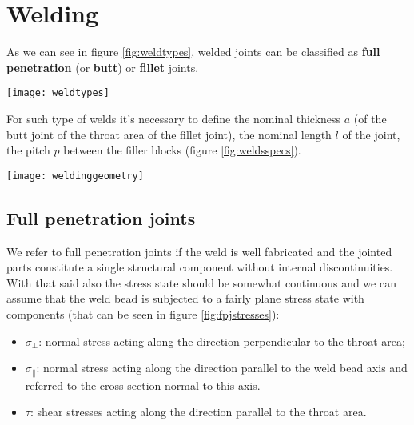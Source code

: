 \section{Welding}

	
	As we can see in figure \ref{fig:weldtypes}, welded joints can be classified as \textbf{full penetration} (or \textbf{butt}) or \textbf{fillet} joints.
	
	\begin{SCfigure}[1][bht]
		\centering \texttt{[image: weldtypes]}
		\caption{classification of welded joints: full penetration (butt) and fillet.} \label{fig:weldtypes}
	\end{SCfigure}

	For such type of welds it's necessary to define the nominal thickness $a$ (of the butt joint of the throat area of the fillet joint), the nominal length $l$ of the joint, the pitch $p$ between the filler blocks (figure \ref{fig:weldsspecs}).
	
	\begin{SCfigure}[1][bht]
		\centering \texttt{[image: weldinggeometry]}
		\caption{examples of nominal thickness $a$ for different types of weldings; representation of length $l$ of the joint and the related pitch. } \label{fig:weldsspecs}
	\end{SCfigure}

\subsection{Full penetration joints}
	
	We refer to full penetration joints if the weld is well fabricated and the jointed parts constitute a single structural component without internal discontinuities. With that said also the stress state should be somewhat continuous and we can assume that the weld bead is subjected to a fairly plane stress state with components (that can be seen in figure \ref{fig:fpjstresses}):
	\begin{itemize}
		\item $\sigma_\perp$: normal stress acting along the direction perpendicular to the throat area;
		\item $\sigma_\parallel$: normal stress acting along the direction parallel to the weld bead axis and referred to the cross-section normal to this axis.
		\item $\tau$: shear stresses acting along the direction parallel to the throat area.
	\end{itemize}
	

